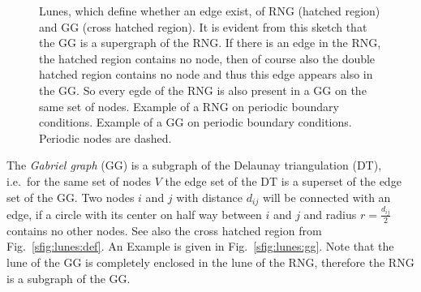     \begin{figure}[htbp]
        \centering
        \caption[Gabriel and Relative Neighborhood Graph]
        {
             Lunes, which define whether an edge
                exist, of RNG (hatched region) and GG (cross hatched region).
                It is evident from this sketch that the GG is a supergraph
                of the RNG. If there is an edge in the RNG, the hatched
                region contains no node, then of course also the double
                hatched region contains no node and thus this edge appears
                also in the GG. So every egde of the RNG is also present
                in a GG on the same set of nodes.
             Example of a RNG on periodic
                boundary conditions.
             Example of a GG on
                periodic boundary conditions. Periodic nodes are dashed.
        }
        \label{fig:lunes}
    \end{figure}

    The \emph{Gabriel graph} (GG) \cite{Gabriel1969} is a subgraph
    of the Delaunay triangulation \cite{Delaunay1934,Katajainen}
    (DT), i.e.~for the same set of nodes \(V\) the edge set of the
    DT is a superset of the edge set of the GG. Two nodes \(i\) and
    \(j\) with distance \(d_{ij}\) will be connected with an edge,
    if a circle with its center on half way between \(i\) and \(j\)
    and radius \(r = \frac{d_{ij}}{2}\) contains no other nodes. See
    also the cross hatched region from Fig.~\ref{sfig:lunes:def}. An
    Example is given in Fig.~\ref {sfig:lunes:gg}. Note that the
    lune of the GG is completely enclosed in the lune of the RNG,
    therefore the RNG is a subgraph of the GG.

